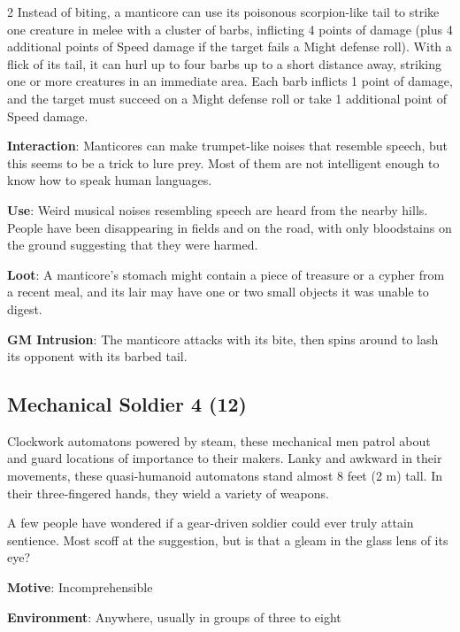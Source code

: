 \begin{multicols}{2}
Instead of biting, a manticore can use its poisonous scorpion-like tail to strike one creature in melee with a cluster of barbs, inflicting 4 points of damage (plus 4 additional points of Speed damage if the target fails a Might defense roll). With a flick of its tail, it can hurl up to four barbs up to a short distance away, striking one or more creatures in an immediate area. Each barb inflicts 1 point of damage, and the target must succeed on a Might defense roll or take 1 additional point of Speed damage. 

\textbf{Interaction}: Manticores can make trumpet-like noises that resemble speech, but this seems to be a trick to lure prey. Most of them are not intelligent enough to know how to speak human languages. 

\textbf{Use}: Weird musical noises resembling speech are heard from the nearby hills. People have been disappearing in fields and on the road, with only bloodstains on the ground suggesting that they were harmed. 

\textbf{Loot}: A manticore’s stomach might contain a piece of treasure or a cypher from a recent meal, and its lair may have one or two small objects it was unable to digest.

\textbf{GM Intrusion}: The manticore attacks with its bite, then spins around to lash its opponent with its barbed tail.

\subsection{Mechanical Soldier	4 (12)}

Clockwork automatons powered by steam, these mechanical men patrol about and guard locations of importance to their makers. Lanky and awkward in their movements, these quasi-humanoid automatons stand almost 8 feet (2 m) tall. In their three-fingered hands, they wield a variety of weapons.

A few people have wondered if a gear-driven soldier could ever truly attain sentience. Most scoff at the suggestion, but is that a gleam in the glass lens of its eye?

\textbf{Motive}: Incomprehensible

\textbf{Environment}: Anywhere, usually in groups of three to eight


\end{multicols}
